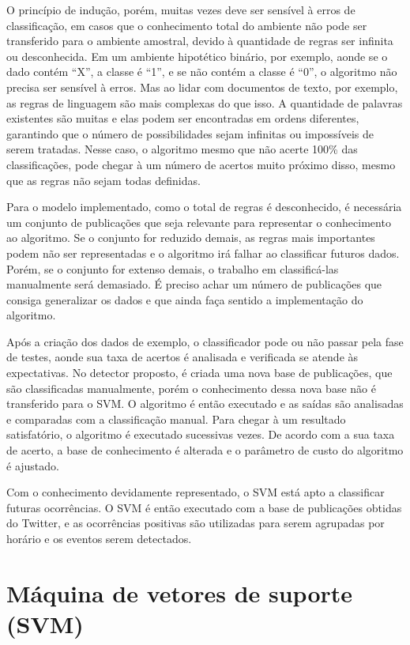 O princípio de indução, porém, muitas vezes deve ser sensível à erros de classificação, em casos que o conhecimento total do ambiente não pode ser transferido para o ambiente amostral, devido à quantidade de regras ser infinita ou desconhecida. Em um ambiente hipotético binário, por exemplo, aonde se o dado contém ``X'', a classe é ``1'', e se não contém a classe é ``0'', o algoritmo não precisa ser sensível à erros. Mas ao lidar com documentos de texto, por exemplo, as regras de linguagem são mais complexas do que isso. A quantidade de palavras existentes são muitas e elas podem ser encontradas em ordens diferentes, garantindo que o número de possibilidades sejam infinitas ou impossíveis de serem tratadas. Nesse caso, o algoritmo mesmo que não acerte 100\% das classificações, pode chegar à um número de acertos muito próximo disso, mesmo que as regras não sejam todas definidas. 

Para o modelo implementado, como o total de regras é desconhecido, é necessária um conjunto de publicações que seja relevante para representar o conhecimento ao algoritmo. Se o conjunto for reduzido demais, as regras mais importantes podem não ser representadas e o algoritmo irá falhar ao classificar futuros dados. Porém, se o conjunto for extenso demais, o trabalho em classificá-las manualmente será demasiado. É preciso achar um número de publicações que consiga generalizar os dados e que ainda faça sentido a implementação do algoritmo.

Após a criação dos dados de exemplo, o classificador pode ou não passar pela fase de testes, aonde sua taxa de acertos é analisada e verificada se atende às expectativas. No detector proposto, é criada uma nova base de publicações, que são classificadas manualmente, porém o conhecimento dessa nova base não é transferido para o SVM. O algoritmo é então executado e as saídas são analisadas e comparadas com a classificação manual. Para chegar à um resultado satisfatório, o algoritmo é executado sucessivas vezes. De acordo com a sua taxa de acerto, a base de conhecimento é alterada e o parâmetro de custo do algoritmo é ajustado.

Com o conhecimento devidamente representado, o SVM está apto a classificar futuras ocorrências. O SVM é então executado com a base de publicações obtidas do Twitter, e as ocorrências positivas são utilizadas para serem agrupadas por horário e os eventos serem detectados.

\section{Máquina de vetores de suporte (SVM)}

